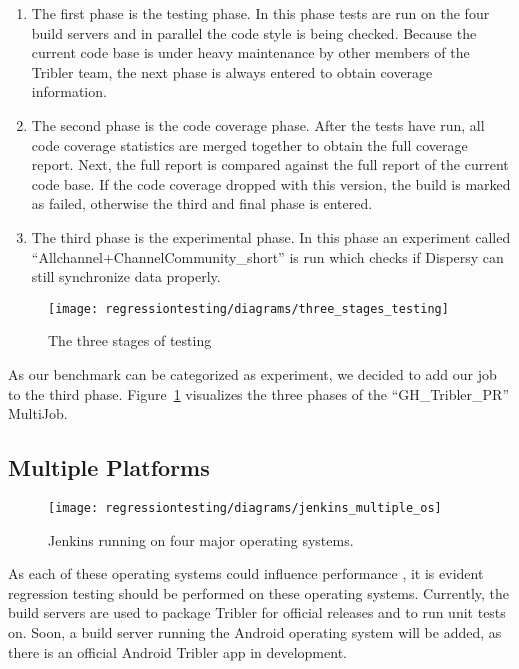 \begin{enumerate}
	\item The first phase is the testing phase. In this phase tests are run on the four build servers and in parallel the code style is being checked. Because the current code base is under heavy maintenance by other members of the Tribler team, the next phase is always entered to obtain coverage information.
	\item The second phase is the code coverage phase. After the tests have run, all code coverage statistics are merged together to obtain the full coverage report. Next, the full report is compared against the full report of the current code base. If the code coverage dropped with this version, the build is marked as failed, otherwise the third and final phase is entered.
	\item The third phase is the experimental phase. In this phase an experiment called \enquote{Allchannel+ChannelCommunity\_short} is run which checks if Dispersy can still synchronize data properly.
\end{enumerate}

\begin{figure}[!h]
	\centering
	\texttt{[image: regressiontesting/diagrams/three\_stages\_testing]}
	\caption{The three stages of testing}
	\label{fig:three_stages_of_testing}
\end{figure} 

As our benchmark can be categorized as experiment, we decided to add our job to the third phase.
Figure~\ref{fig:three_stages_of_testing} visualizes the three phases of the \enquote{GH\_Tribler\_PR} MultiJob.

\subsection{Multiple Platforms}
\label{sct:multiple_platforms}

\begin{figure}[!h]
	\centering
	\texttt{[image: regressiontesting/diagrams/jenkins\_multiple\_os]}
	\caption{Jenkins running on four major operating systems.}
	\label{fig:jenkins_multiple_os}
\end{figure} 

As each of these operating systems could influence performance \cite{gupta1991impact}, it is evident regression testing should be performed on these operating systems.
Currently, the build servers are used to package Tribler for official releases and to run unit tests on.
Soon, a build server running the Android operating system will be added, as there is an official Android Tribler app in development.


